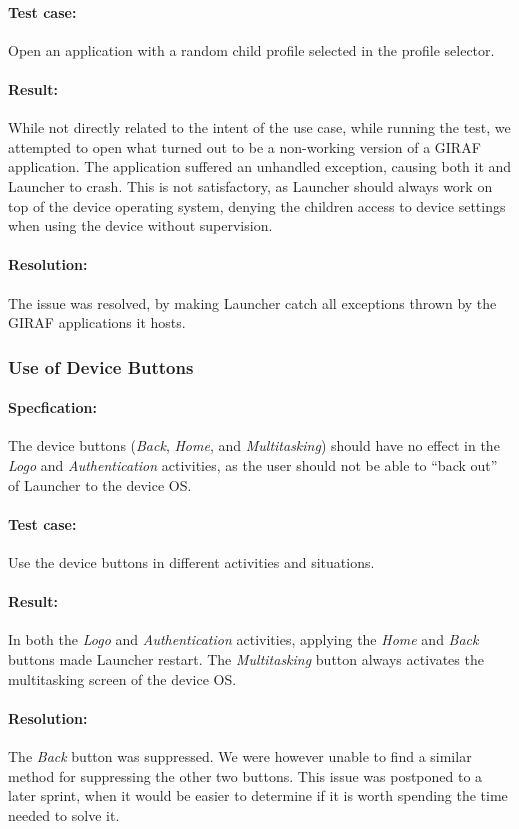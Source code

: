 \paragraph{Test case:} Open an application with a random child profile selected in the profile selector.
\paragraph{Result:} While not directly related to the intent of the use case, while running the test, we attempted to open what turned out to be a non-working version of a GIRAF application. The application suffered an unhandled exception, causing both it and Launcher to crash. This is not satisfactory, as Launcher should always work on top of the device operating system, denying the children access to device settings when using the device without supervision.
\paragraph{Resolution:} The issue was resolved, by making Launcher catch all exceptions thrown by the GIRAF applications it hosts.


\subsubsection{Use of Device Buttons}

\paragraph{Specfication:} The device buttons (\textit{Back}, \textit{Home}, and \textit{Multitasking}) should have no effect in the \textit{Logo} and \textit{Authentication} activities, as the user should not be able to ``back out'' of Launcher to the device OS.
\paragraph{Test case:} Use the device buttons in different activities and situations.
\paragraph{Result:} In both the \textit{Logo} and \textit{Authentication} activities, applying the \textit{Home} and \textit{Back} buttons made Launcher restart. The \textit{Multitasking} button always activates the multitasking screen of the device OS.
\paragraph{Resolution:} The \textit{Back} button was suppressed. We were however unable to find a similar method for suppressing the other two buttons. This issue was postponed to a later sprint, when it would be easier to determine if it is worth spending the time needed to solve it.